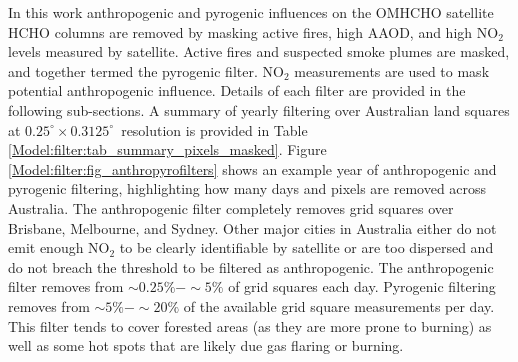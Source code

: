 \documentclass[acp, manuscript]{copernicus}
\newcommand{\highhr}{$0.25^{\circ} \times 0.3125^{\circ}$}
\begin{document}
  
  In this work anthropogenic and pyrogenic influences on the OMHCHO satellite HCHO columns are removed by masking active fires, high AAOD, and high NO$_2$ levels measured by satellite.
  Active fires and suspected smoke plumes are masked, and together termed the pyrogenic filter.
  NO$_2$ measurements are used to mask potential anthropogenic influence.  
  Details of each filter are provided in the following sub-sections.
  A summary of yearly filtering over Australian land squares at \highhr ~resolution is provided in Table \ref{Model:filter:tab_summary_pixels_masked}.
  Figure \ref{Model:filter:fig_anthropyrofilters} shows an example year of anthropogenic and pyrogenic filtering, highlighting how many days and pixels are removed across Australia.
  The anthropogenic filter completely removes grid squares over Brisbane, Melbourne, and Sydney. 
  Other major cities in Australia either do not emit enough NO$_2$ to be clearly identifiable by satellite or are too dispersed and do not breach the threshold to be filtered as anthropogenic.
  The anthropogenic filter removes from $\sim 0.25\% - \sim5\%$ of grid squares each day.
  Pyrogenic filtering removes from $\sim 5\% - \sim 20\%$ of the available grid square measurements per day.
  This filter tends to cover forested areas (as they are more prone to burning) as well as some hot spots that are likely due gas flaring or burning.
  
\end{document}
